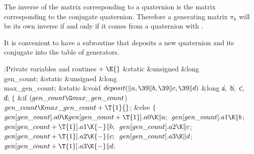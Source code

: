 The inverse of the matrix corresponding to a quaternion is the matrix
corresponding to the conjugate quaternion. Therefore a generating
matrix $\pi_k$ will be its own inverse if and only if it comes from
a quaternion with .

It is convenient to have a subroutine that deposits a new quaternion
and its conjugate into the table of generators.

\Y\B\4:Private variables and routines\X${}\mathrel+\E{}$\6
\&{static} \&{unsigned} \&{long} \\{gen\_count};\6
\&{static} \&{unsigned} \&{long} \\{max\_gen\_count};\7
\1\1\&{static} \&{void} ${}\\{deposit}(\|a,\39\|b,\39\|c,\39\|d){}$\6
\&{long} \|a${},{}$ \|b${},{}$ \|c${},{}$ \|d;\2\2\6
${}\{{}$\1\6
\&{if} ${}(\\{gen\_count}\G\\{max\_gen\_count}{}$)\1\6
${}\\{gen\_count}\K\\{max\_gen\_count}+\T{1}{}$;\2\6
\&{else}\5
${}\{{}$\1\6
${}\\{gen}[\\{gen\_count}].\\{a0}\K\\{gen}[\\{gen\_count}+\T{1}].\\{a0}\K%
\|a;{}$\6
${}\\{gen}[\\{gen\_count}].\\{a1}\K\|b{}$;\5
${}\\{gen}[\\{gen\_count}+\T{1}].\\{a1}\K{-}\|b;{}$\6
${}\\{gen}[\\{gen\_count}].\\{a2}\K\|c{}$;\5
${}\\{gen}[\\{gen\_count}+\T{1}].\\{a2}\K{-}\|c;{}$\6
${}\\{gen}[\\{gen\_count}].\\{a3}\K\|d{}$;\5
${}\\{gen}[\\{gen\_count}+\T{1}].\\{a3}\K{-}\|d;{}$\6

